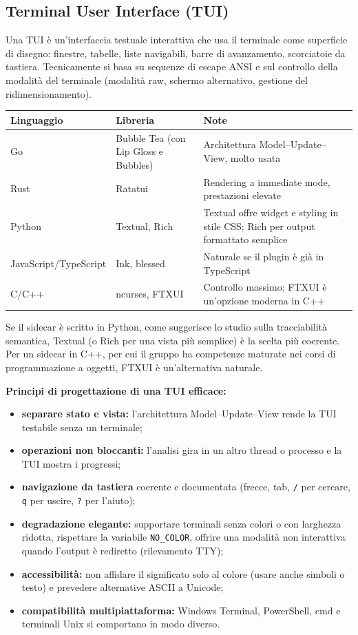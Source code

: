 \documentclass[a4paper, 11pt]{article}
\begin{document}
\subsection{Terminal User Interface (TUI)}
Una TUI è un'interfaccia testuale interattiva che usa il terminale come superficie di disegno: finestre, tabelle, liste navigabili, barre di avanzamento, scorciatoie da tastiera. Tecnicamente si basa su sequenze di escape ANSI e sul controllo della modalità del terminale (modalità raw, schermo alternativo, gestione del ridimensionamento).

\vspace{0.3cm}
\noindent
\begin{tabularx}{\textwidth}{|l|l|X|}
    \hline
    \textbf{Linguaggio} & \textbf{Libreria} & \textbf{Note} \\ \hline
    Go & Bubble Tea (con Lip Gloss e Bubbles) & Architettura Model--Update--View, molto usata \\ \hline
    Rust & Ratatui & Rendering a immediate mode, prestazioni elevate \\ \hline
    Python & Textual, Rich & Textual offre widget e styling in stile CSS; Rich per output formattato semplice \\ \hline
    JavaScript/TypeScript & Ink, blessed & Naturale se il plugin è già in TypeScript \\ \hline
    C/C++ & ncurses, FTXUI & Controllo massimo; FTXUI è un'opzione moderna in C++ \\ \hline
\end{tabularx}
\vspace{0.3cm}

Se il sidecar è scritto in Python, come suggerisce lo studio sulla tracciabilità semantica, Textual (o Rich per una vista più semplice) è la scelta più coerente. Per un sidecar in C++, per cui il gruppo ha competenze maturate nei corsi di programmazione a oggetti, FTXUI è un'alternativa naturale.

\textbf{Principi di progettazione di una TUI efficace:}
\begin{itemize}[noitemsep]
    \item \textbf{separare stato e vista:} l'architettura Model--Update--View rende la TUI testabile senza un terminale;
    \item \textbf{operazioni non bloccanti:} l'analisi gira in un altro thread o processo e la TUI mostra i progressi;
    \item \textbf{navigazione da tastiera} coerente e documentata (frecce, tab, \texttt{/} per cercare, \texttt{q} per uscire, \texttt{?} per l'aiuto);
    \item \textbf{degradazione elegante:} supportare terminali senza colori o con larghezza ridotta, rispettare la variabile \texttt{NO\_COLOR}, offrire una modalità non interattiva quando l'output è rediretto (rilevamento TTY);
    \item \textbf{accessibilità:} non affidare il significato solo al colore (usare anche simboli o testo) e prevedere alternative ASCII a Unicode;
    \item \textbf{compatibilità multipiattaforma:} Windows Terminal, PowerShell, cmd e terminali Unix si comportano in modo diverso.
\end{itemize}
\end{document}
